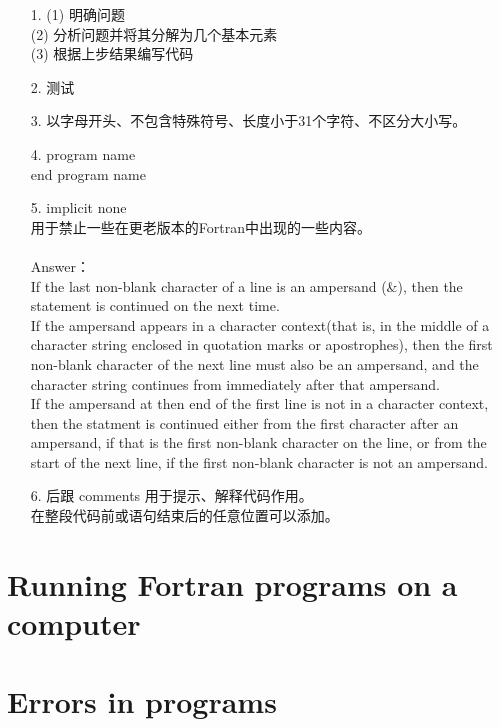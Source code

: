 \documentclass[a4paper,titlepage]{report}
\begin{document}
\begin{itemize}
  \item[1.]
  (1) 明确问题 \\
  (2) 分析问题并将其分解为几个基本元素 \\
  (3) 根据上步结果编写代码

  \item[2.]
  测试

  \item[3.]
  以字母开头、不包含特殊符号、长度小于31个字符、不区分大小写。

  \item[4.]
  program name \\
  end program name

  \item[5.]
  implicit none \\
  用于禁止一些在更老版本的Fortran中出现的一些内容。 \\ \\

  Answer： \\
  If the last non-blank character of a line is an ampersand (\&), then the statement is continued on the next time. \\
  If the ampersand appears in a character context(that is, in the middle of a character string enclosed in quotation marks or apostrophes), then the first non-blank character of the next line must also be an ampersand, and the character string continues from immediately after that ampersand. \\
  If the ampersand at then end of the first line is not in a character context, then the statment is continued either from the first character after an ampersand, if that is the first non-blank character on the line, or from the start of the next line, if the first non-blank character is not an ampersand.

  \item[6.]
  \! 后跟 comments 用于提示、解释代码作用。 \\
  在整段代码前或语句结束后的任意位置可以添加。

\end{itemize}

\section{Running Fortran programs on a computer}

\section{Errors in programs}
\end{document}
